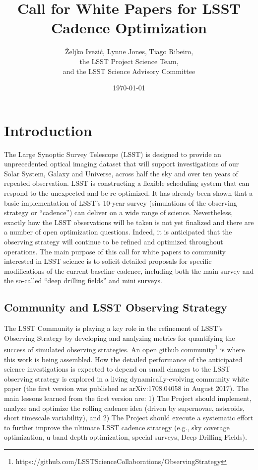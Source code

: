 \documentclass[DM,lsstdraft,toc,usenatbib]{lsstdoc}
\title[Call for LSST Cadence White Papers]{Call for White Papers for LSST Cadence Optimization}
\author{\v{Z}eljko Ivezi\'{c}, Lynne Jones, Tiago Ribeiro, 
             \\  the LSST Project Science Team, 
              \\ and  the LSST Science Advisory Committee}
\date{\today}
\begin{document}
\maketitle

\section{Introduction} 

The Large Synoptic Survey Telescope (LSST) is designed to provide an unprecedented optical 
imaging dataset that will support investigations of our Solar System, Galaxy and Universe, 
across half the sky and over ten years of repeated observation. LSST is constructing a 
flexible scheduling system that can respond to the unexpected and be re-optimized. 
It has already been shown that a basic implementation of LSST's 10-year survey (simulations of 
the observing strategy or ``cadence'') can deliver on a wide range of science. 
Nevertheless, exactly how the LSST observations will be taken is not yet finalized and there
are a number of open optimization questions. Indeed, it is anticipated that the observing strategy 
will continue to be refined and optimized throughout operations. The main purpose of this 
call for white papers to community interested in LSST science is to solicit detailed proposals
for specific modifications of the current baseline cadence, including both the main survey and 
the so-called ``deep drilling fields'' and mini surveys. 


\subsection{Community and LSST Observing Strategy}

The LSST Community is playing a key role in the refinement of LSST’s Observing Strategy by 
developing and analyzing metrics for quantifying the success of simulated observing strategies.
An open github community\footnote{
https://github.com/LSSTScienceCollaborations/ObservingStrategy}
is where this work is being assembled. How the detailed performance of the anticipated 
science investigations is expected to depend on small changes to the LSST observing 
strategy is explored in a living dynamically-evolving community white paper (the first
version was published as arXiv:1708.04058 in August 2017). The main lessons 
learned from the first version are: 1) The Project should implement, analyze and optimize 
the rolling cadence idea (driven by supernovae, asteroids, short timescale variability),
and 2) The Project should execute a systematic effort to further improve the ultimate 
LSST cadence strategy (e.g., sky coverage optimization, u band depth optimization, special 
surveys, Deep Drilling Fields). 
\end{document}
